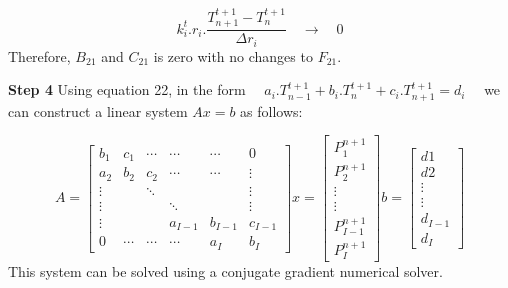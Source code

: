 \documentclass[11pt,letterpaper,titlepage]{article}
\begin{document}
\begin{equation*}
k_i^t.r_i. \frac{T_{n+1}^{t+1} - T_{n}^{t+1}}{\Delta r_i} \quad \to \quad 0 
\end{equation*}
\newline
Therefore, $B_{21}$ and $C_{21}$ is zero with no changes to $F_{21}$.






\newpage
\vspace{0.5cm}\noindent
\textbf{Step 4}\newline
Using equation 22, in the form $\quad a_i.T_{n-1}^{t+1} + b_i.T_{n}^{t+1} + c_i.T_{n+1}^{t+1} = d_i \quad $ we can construct a linear system $Ax=b$ as follows:

\begin{equation*}
A=
\begin{bmatrix}
b_1    & c_1     & \cdots & \cdots & \cdots & 0      \\
a_2    & b_2     & c_2    & \cdots & \cdots & \vdots \\
\vdots &         & \ddots &        &        & \vdots \\
\vdots &         &        & \ddots &        & \vdots \\
\vdots &         &        &a_{I-1} &b_{I-1} &c_{I-1}  \\
0      & \cdots  & \cdots & \cdots & a_I    & b_I 
\end{bmatrix}
x=
\begin{bmatrix}
P_1^{n+1} \\
P_2^{n+1} \\
\vdots \\
\vdots \\
P_{I-1}^{n+1} \\
P_I^{n+1} 
\end{bmatrix}
b=
\begin{bmatrix}
d1 \\
d2 \\
\vdots \\
\vdots \\
d_{I-1}\\
d_I
\end{bmatrix}
\end{equation*}
\newline
This system can be solved using a conjugate gradient numerical solver.









\newpage
{}
\begin{thebibliography}{1}

	
\end{thebibliography}
\end{document}
